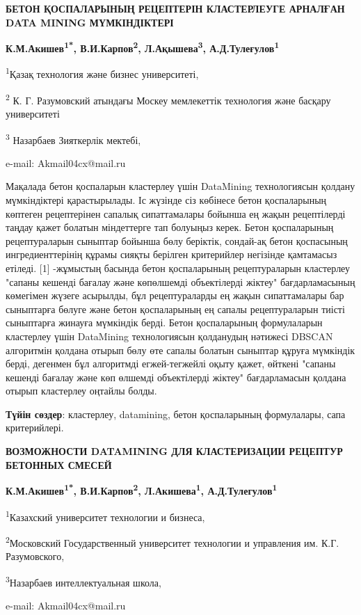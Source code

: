 \begin{center}
{\large\bfseries БЕТОН ҚОСПАЛАРЫНЫҢ РЕЦЕПТЕРІН КЛАСТЕРЛЕУГЕ АРНАЛҒАН DATA MINING
МҮМКІНДІКТЕРІ}

\vspace{1em}
{\bfseries К.М.Акишев\textsuperscript{1*}, В.И.Карпов\textsuperscript{2},
Л.Ақышева\textsuperscript{3}, А.Д.Тулеғулов\textsuperscript{1}}

\textsuperscript{1}Қазақ технология және бизнес университеті,

\textsuperscript{2} К. Г. Разумовский атындағы Москеу мемлекеттік
технология және басқару университеті

\textsuperscript{3} Назарбаев Зияткерлік мектебі,

e-mail: Akmail04cx@mail.ru
\end{center}

Мақалада бетон қоспаларын кластерлеу үшін DataMining технологиясын
қолдану мүмкіндіктері қарастырылады. Іс жүзінде сіз көбінесе бетон
қоспаларының көптеген рецептерінен сапалық сипаттамалары бойынша ең
жақын рецептілерді таңдау қажет болатын міндеттерге тап болуыңыз керек.
Бетон қоспаларының рецептураларын сыныптар бойынша бөлу беріктік,
сондай-ақ бетон қоспасының ингредиенттерінің құрамы сияқты берілген
критерийлер негізінде қамтамасыз етіледі. {[}1{]} -жұмыстың басында
бетон қоспаларының рецептураларын кластерлеу "сапаны кешенді бағалау
және көпөлшемді объектілерді жіктеу" бағдарламасының көмегімен жүзеге
асырылды, бұл рецептураларды ең жақын сипаттамалары бар сыныптарға
бөлуге және бетон қоспаларының ең сапалы рецептураларын тиісті
сыныптарға жинауға мүмкіндік берді. Бетон қоспаларының формулаларын
кластерлеу үшін DataMining технологиясын қолданудың нәтижесі DBSCAN
алгоритмін қолдана отырып бөлу өте сапалы болатын сыныптар құруға
мүмкіндік берді, дегенмен бұл алгоритмді егжей-тегжейлі оқыту қажет,
өйткені "сапаны кешенді бағалау және көп өлшемді объектілерді жіктеу"
бағдарламасын қолдана отырып кластерлеу оңтайлы болды.

{\bfseries Түйін сөздер}: кластерлеу, datamining, бетон қоспаларының
формулалары, сапа критерийлері.

\newpage
\begin{center}
{\large\bfseries ВОЗМОЖНОСТИ DATAMINING ДЛЯ КЛАСТЕРИЗАЦИИ РЕЦЕПТУР БЕТОННЫХ
СМЕСЕЙ}

\vspace{1em}
{\bfseries К.М.Акишев\textsuperscript{1*}, В.И.Карпов\textsuperscript{2},
Л.Акишева\textsuperscript{1}, А.Д.Тулегулов\textsuperscript{1}}

\textsuperscript{1}Казахский университет технологии и бизнеса,

\textsuperscript{2}Московский Государственный университет
технологии и управления им. К.Г. Разумовского,

\textsuperscript{3}Назарбаев интеллектуальная школа,

e-mail: Akmail04cx@mail.ru
\end{center}

